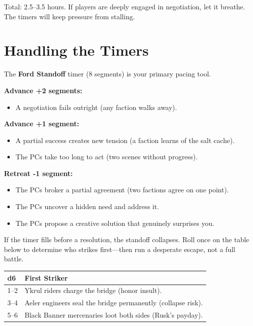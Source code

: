 \documentclass[10pt,twoside]{book}
\begin{document}
Total: 2.5--3.5 hours. If players are deeply engaged in negotiation, let it breathe. The timers will keep pressure from stalling.

\section*{Handling the Timers}

The \textbf{Ford Standoff} timer (8 segments) is your primary pacing tool. 

\begin{timersidebar}
\textbf{Advance +2 segments:}
\begin{itemize}
\item A negotiation fails outright (any faction walks away).
\end{itemize}
\textbf{Advance +1 segment:}
\begin{itemize}
\item A partial success creates new tension (a faction learns of the salt cache).
\item The PCs take too long to act (two scenes without progress).
\end{itemize}
\textbf{Retreat -1 segment:}
\begin{itemize}
\item The PCs broker a partial agreement (two factions agree on one point).
\item The PCs uncover a hidden need and address it.
\item The PCs propose a creative solution that genuinely surprises you.
\end{itemize}
\end{timersidebar}

If the timer fills before a resolution, the standoff collapses. Roll once on the table below to determine who strikes first---then run a desperate escape, not a full battle.

\begin{center}
\begin{tabular}{@{}l l@{}}
\toprule
\textbf{d6} & \textbf{First Striker} \\
\midrule
1--2 & Ykrul riders charge the bridge (honor insult). \\
3--4 & Aeler engineers seal the bridge permanently (collapse risk). \\
5--6 & Black Banner mercenaries loot both sides (Rusk's payday). \\
\bottomrule
\end{tabular}
\end{center}
\end{document}
